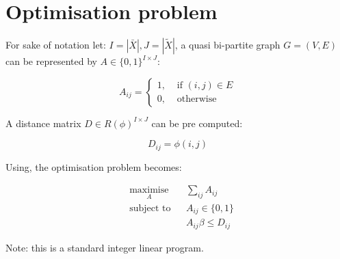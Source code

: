\documentclass{article}
\theoremstyle{definition} \newtheorem{definition}{Definition}
\begin{document}
\section{Optimisation problem}\label{sec:optimisation-problem}

For sake of notation let: \(I=|\bar X|, J=|\tilde X|\), a quasi bi-partite graph
\(G=(V, E)\) can be represented by \(A\in \{0, 1\}^{I\times J}\):

\[
    A_{ij}
    =
    \begin{cases}
        1,&\text{ if }(i, j)\in E\\
        0,&\text{ otherwise}
    \end{cases}
\]

A distance matrix \(D\in R(\phi)^{I\times J}\) can be pre computed:

\[
    D_{ij}
    =
    \phi(i, j)
\]

Using, the optimisation problem becomes:

\begin{equation*}
	\begin{aligned}
		& \underset{A}{\text{maximise}}
        &                               & \sum_{ij}A_{ij} \\
        & \text{subject to}
        &                               & A_{ij} \in \{0, 1\} \\
        &
        &                               & A_{ij}\beta \leq D_{ij}
	\end{aligned}
\end{equation*}

Note: this is a standard integer linear program.

\end{document}

